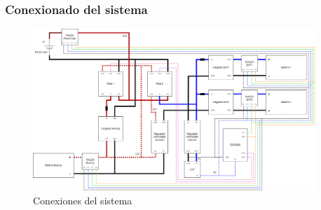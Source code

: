 \subsubsection{Conexionado del sistema}



\begin{figure}[H]
    \centering
    \includegraphics[width=0.95\textwidth]{images/2-hardware/Conexiones.png}
    \caption{Conexiones del sistema}
    \label{fig:hardware/conexiones}
\end{figure}
